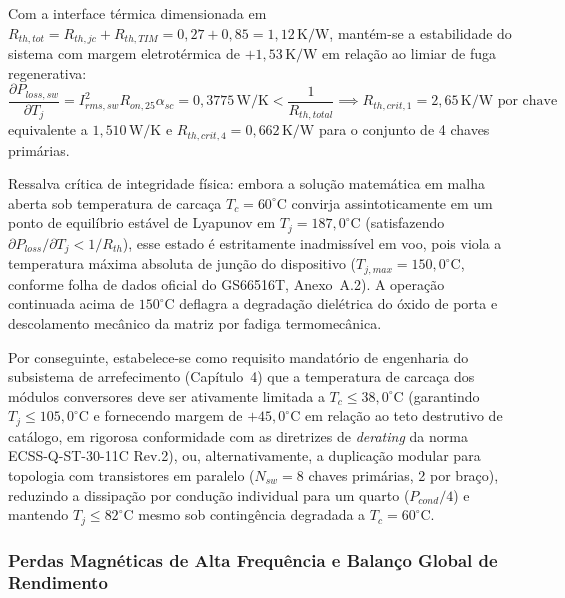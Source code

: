 Com a interface térmica dimensionada em $R_{th,tot} = R_{th,jc} + R_{th,TIM} = 0{,}27 + 0{,}85 = 1{,}12\,\mathrm{K/W}$, mantém-se a estabilidade do sistema com margem eletrotérmica de $+1{,}53\,\mathrm{K/W}$ em relação ao limiar de fuga regenerativa:
\begin{equation}
    \frac{\partial P_{loss,sw}}{\partial T_j} = I_{rms,sw}^2 R_{on,25} \alpha_{sc} = 0{,}3775\,\mathrm{W/K} < \frac{1}{R_{th,total}} \implies R_{th,crit,1} = 2{,}65\,\mathrm{K/W \text{ por chave}}
    \label{eq:criterio_fuga_termica_blindado}
\end{equation}
equivalente a $1{,}510\,\mathrm{W/K}$ e $R_{th,crit,4} = 0{,}662\,\mathrm{K/W}$ para o conjunto de 4 chaves primárias. 

Ressalva crítica de integridade física: embora a solução matemática em malha aberta sob temperatura de carcaça $T_c = 60^\circ\text{C}$ convirja assintoticamente em um ponto de equilíbrio estável de Lyapunov em $T_j = 187{,}0^\circ\text{C}$ (satisfazendo $\partial P_{loss}/\partial T_j < 1/R_{th}$), esse estado é estritamente inadmissível em voo, pois viola a temperatura máxima absoluta de junção do dispositivo ($T_{j,max} = 150{,}0^\circ\text{C}$, conforme folha de dados oficial do GS66516T, Anexo~A.2). A operação continuada acima de $150^\circ\text{C}$ deflagra a degradação dielétrica do óxido de porta e descolamento mecânico da matriz por fadiga termomecânica. 

Por conseguinte, estabelece-se como requisito mandatório de engenharia do subsistema de arrefecimento (Capítulo~4) que a temperatura de carcaça dos módulos conversores deve ser ativamente limitada a $T_c \le 38{,}0^\circ\text{C}$ (garantindo $T_j \le 105{,}0^\circ\text{C}$ e fornecendo margem de $+45{,}0^\circ\text{C}$ em relação ao teto destrutivo de catálogo, em rigorosa conformidade com as diretrizes de \textit{derating} da norma ECSS-Q-ST-30-11C Rev.2), ou, alternativamente, a duplicação modular para topologia com transistores em paralelo ($N_{sw} = 8$ chaves primárias, 2 por braço), reduzindo a dissipação por condução individual para um quarto ($P_{cond}/4$) e mantendo $T_j \le 82^\circ\text{C}$ mesmo sob contingência degradada a $T_c = 60^\circ\text{C}$.
\subsubsection{Perdas Magnéticas de Alta Frequência e Balanço Global de Rendimento}


